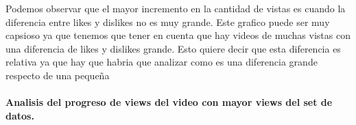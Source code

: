             \begin{figure}[ht]
            \end{figure}
        \FloatBarrier
        Podemos observar que el mayor incremento en la cantidad de vistas es
        cuando la diferencia entre likes y dislikes no es muy grande. Este
        grafico puede ser muy capsioso ya que tenemos que tener en cuenta que
        hay videos de muchas vistas con una diferencia de likes y dislikes
        grande. Esto quiere decir que esta diferencia es relativa ya que hay que
        habria que analizar como es una diferencia grande respecto de una pequeña

        \newpage
        \paragraph{Analisis del progreso de views del video con mayor views del set de datos.}

